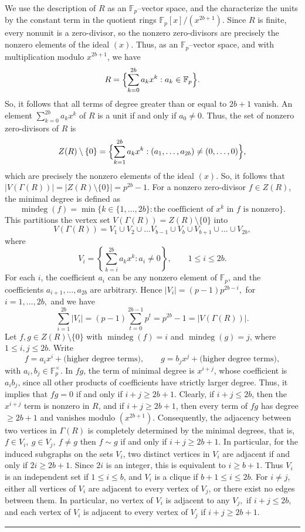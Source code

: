 \documentclass[12pt,twoside]{article}
\renewenvironment{proof}{{\noindent\bfseries Proof.}}{\qed}
\def\qed{\nolinebreak\hfill\rule{.2cm}{.2cm}\par\addvspace{.5cm}}
\begin{document}
\begin{proof}
We use the description of $R$ as an $\mathbb{F}_p$--vector space, and the characterize the
		units by the constant term in the quotient rings $\mathbb{F}_p[x]/(x^{2b+1})$.	Since $R$ is finite, every nonunit is a zero-divisor, so the nonzero zero-divisors are precisely the nonzero elements of the ideal $(x)$. Thus, as an $\mathbb{F}_p$--vector space, and with multiplication modulo $x^{2b+1}$, we have
		\[
		R = \Bigl\{\sum_{k=0}^{2b} a_k x^k : a_k \in \mathbb{F}_p\Bigr\}.
		\]
		 So, it follows that all terms of degree greater than or equal to $2b+1$ vanish.	An element $\sum_{k=0}^{2b} a_k x^k$ of $R$ is a unit if and only if $a_0\neq 0$. Thus, the set of nonzero zero-divisors of $R$ is
		\[
		Z(R)\setminus\{0\}
		= \Bigl\{\sum_{k=1}^{2b} a_k x^k : (a_1,\dots,a_{2b}) \neq (0,\dots,0)\Bigr\},
		\]
		which are precisely the nonzero elements of the ideal $(x)$. So, it follows that $|V( \varGamma(R))|
		= |Z(R)\setminus\{0\}|
		= p^{ 2b} - 1.$ For a nonzero zero-divisor $f \in Z(R)$,  the minimal degree is defined as
		\[
		\operatorname{mindeg}(f)
		= \min\bigl\{k \in \{1,\dots,2b\} : \text{the coefficient of $x^k$ in $f$ is nonzero}\bigr\}.
		\]
		This partitions the vertex set $V( \varGamma(R)) = Z(R)\setminus\{0\}$ into 
		$$V( \varGamma(R)) = V_1 \cup V_2 \cup \dots V_{b-1}\cup V_{b}\cup V_{b+1}\cup \dots \cup V_{2b},$$
		where
		\[
		V_i= \left\{\sum_{k=i}^{2b} a_k x^k : a_i \neq 0
		\right\}, \qquad 1\le i \le 2b.
		\]
		For each $i$, the coefficient $a_i$ can be any nonzero element of $\mathbb{F}_p$,
		and the coefficients $a_{i+1},\dots,a_{2b}$ are arbitrary. Hence $	|V_i|
		= (p-1)p^{ 2b-i}, $ for $ i=1,\dots,2b,$		and we have
		\[
		\sum_{i=1}^{2b} |V_i|
		= (p-1)\sum_{t=0}^{2b-1} p^t
		= p^{ 2b}-1
		= |V( \varGamma(R))|.
		\]
		Let $f,g\in Z(R)\setminus\{0\}$ with $\operatorname{mindeg}(f)=i$ and
		$\operatorname{mindeg}(g)=j$, where $1\le i,j\le 2b$. Write
		\[
		f = a_i x^i + \text{(higher degree terms)}, \qquad
		g = b_j x^j + \text{(higher degree terms)},
		\]
		with $a_i,b_j \in \mathbb{F}_p^\times$. In  $fg$, the term of minimal degree is $x^{i+j}$, whose coefficient is $a_i b_j$,
		since all other products of coefficients have strictly larger degree.
		Thus, it implies that	$fg = 0  $ if and only if $ i+j \ge 2b+1.$	Clearly, if $i+j \le 2b$, then the $x^{i+j}$ term is nonzero in $R$, and  if $i+j\ge 2b+1$,	then every term of $fg$ has degree $\ge 2b+1$ and vanishes modulo $(x^{2b+1})$. Consequently, the adjacency between two vertices in $ \varGamma(R)$ is completely determined by the minimal degrees, that is, $f \in V_i,\ g\in V_j,\ f\neq g$ then $f\sim g$ if and only if $i+j \ge 2b+1.$ In particular, for the induced subgraphs on the sets $V_i$, two distinct vertices in $V_i$ are adjacent if and only if $2i\ge 2b+1$. Since $2i$ is an integer, this is equivalent to $i\ge b+1$. Thus $V_i$  is an independent set if $1\le i \le b$, and $V_{i}$ is a clique  if  $b+1\le i \le 2b.$ For $i\neq j$, either all vertices of $V_i$ are adjacent to every vertex of $V_j$, or there exist no edges between them. In particular, no vertex of $V_i $ is adjacent to any $V_j,$ if $i+j \le 2b$, and each vertex of $V_{i}$ is adjacent to every vertex of $V_{j}$ if $i+j \ge 2b+1.$
		

\end{proof}
\end{document}
